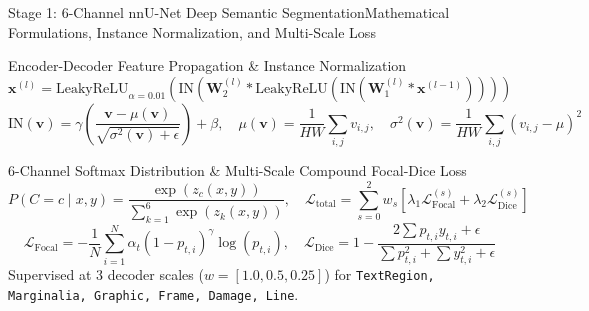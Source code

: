 \documentclass[
  aspectratio=169,
]{beamer}
\begin{document}
\begin{frame}{Stage 1: 6-Channel nnU-Net Deep Semantic Segmentation}{Mathematical Formulations, Instance Normalization, and Multi-Scale Loss}
\begin{block}{Encoder-Decoder Feature Propagation \& Instance Normalization}
\[
  \mathbf{x}^{(l)} = \text{LeakyReLU}_{\alpha=0.01}\left( \text{IN}\left( \mathbf{W}_2^{(l)} * \text{LeakyReLU}\left( \text{IN}\left( \mathbf{W}_1^{(l)} * \mathbf{x}^{(l-1)} \right) \right) \right) \right)
\]
\[
  \text{IN}(\mathbf{v}) = \gamma \left( \frac{\mathbf{v} - \mu(\mathbf{v})}{\sqrt{\sigma^2(\mathbf{v}) + \epsilon}} \right) + \beta, \quad \mu(\mathbf{v}) = \frac{1}{HW}\sum_{i,j} v_{i,j}, \quad \sigma^2(\mathbf{v}) = \frac{1}{HW}\sum_{i,j}(v_{i,j}-\mu)^2
\]
\end{block}
\begin{block}{6-Channel Softmax Distribution \& Multi-Scale Compound Focal-Dice Loss}
\[
  P(C = c \mid x, y) = \frac{\exp(z_c(x, y))}{\sum_{k=1}^{6} \exp(z_k(x, y))}, \quad \mathcal{L}_{\text{total}} = \sum_{s=0}^{2} w_s \left[ \lambda_1 \mathcal{L}_{\text{Focal}}^{(s)} + \lambda_2 \mathcal{L}_{\text{Dice}}^{(s)} \right]
\]
\[
  \mathcal{L}_{\text{Focal}} = -\frac{1}{N} \sum_{i=1}^N \alpha_t (1 - p_{t,i})^\gamma \log(p_{t,i}), \quad \mathcal{L}_{\text{Dice}} = 1 - \frac{2 \sum p_{t,i} y_{t,i} + \epsilon}{\sum p_{t,i}^2 + \sum y_{t,i}^2 + \epsilon}
\]
Supervised at 3 decoder scales ($w = [1.0, 0.5, 0.25]$) for \texttt{TextRegion, Marginalia, Graphic, Frame, Damage, Line}.
\end{block}
\end{frame}
\end{document}
